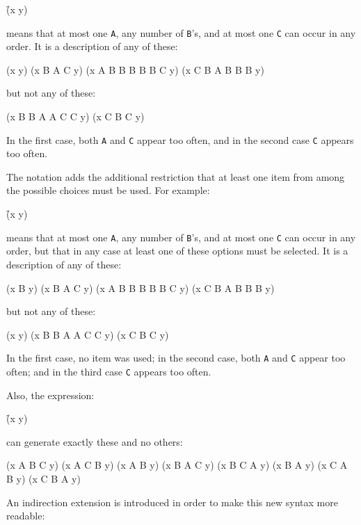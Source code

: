 \f{(x  y)}

\noindent means that at most one {\tt A}, any number of {\tt B}'s, and
at most one {\tt C} can occur in any order.
It is a description of any of these:

\code
 (x y)
 (x B A C y)
 (x A B B B B B C y)
 (x C B A B B B y)
\endcode

\noindent but not any of these:

\code
 (x B B A A C C y)
 (x C B C y)
\endcode

\noindent In the first case, both {\tt A} and {\tt C} appear too often,
and in the second case {\tt C} appears too often.



The notation  
adds the additional restriction that at least one item from among the possible
choices must be used.  For example:

\f{(x  y)}

\noindent means that at most one {\tt A}, any number of {\tt B}'s, and
at most one {\tt C} can occur in any order, but that in any case at least
one of these options must be selected.
It is a description of any of these:

\code
 (x B y)
 (x B A C y)
 (x A B B B B B C y)
 (x C B A B B B y)
\endcode

\noindent but not any of these:

\code
 (x y)
 (x B B A A C C y)
 (x C B C y)
\endcode

\noindent In the first case, no item was used;
in the second case, both {\tt A} and {\tt C} appear too often;
and in the third case {\tt C} appears too often.

Also, the expression:

\f{(x  y)}

\noindent can generate exactly these and no others:

\code
 (x A B C y)
 (x A C B y)
 (x A B y)
 (x B A C y)
 (x B C A y)
 (x B A y)
 (x C A B y)
 (x C B A y)
\endcode



\endsubsubsubsection%


An indirection extension is introduced in order to make this
new syntax more readable:

